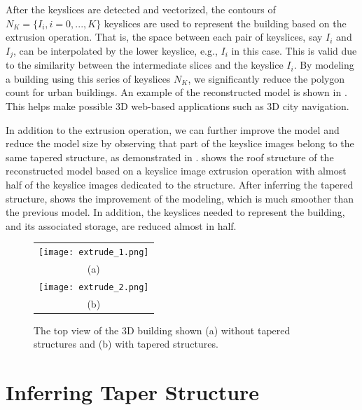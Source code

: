 
After the keyslices are detected and vectorized, the contours of
$N_K = \{I_{i}, i = 0, ..., K \}$ keyslices are used to represent
the building based on the extrusion operation.
That is, the space between each pair of keyslices, say $I_{i}$ and $I_{j}$,
can be interpolated by the lower keyslice, e.g., $I_{i}$ in this case.
This is valid due to the similarity between the intermediate slices
and the keyslice $I_{i}$.
By modeling a building using this series of keyslices $N_K$, we
significantly reduce the polygon count for urban buildings. 
An example of the reconstructed model is shown in .
This helps make possible 3D web-based applications such as 3D city navigation.

In addition to the extrusion operation, we can further improve the model
and reduce the model size by observing that part of the keyslice images
belong to the same tapered structure, as demonstrated in .
 shows the roof structure
of the reconstructed model based on a keyslice image extrusion operation with
almost half of the keyslice images dedicated to the structure.
After inferring the tapered structure,  shows the improvement
of the modeling, which is much smoother than the previous model.
In addition, the keyslices needed to represent the building, and its
associated storage, are reduced almost in half.

\begin{figure}[htbp]
\begin{center}
\begin{tabular}{c}
\texttt{[image: extrude\_1.png]} \\
(a) \\
\texttt{[image: extrude\_2.png]} \\
(b)
\end{tabular}
\end{center}
\caption{The top view of the 3D building shown (a) without tapered structures
and (b) with tapered structures.}
\label{fig:DXF_top}
\end{figure}

\section{Inferring Taper Structure}
\label{sec:tsd}

